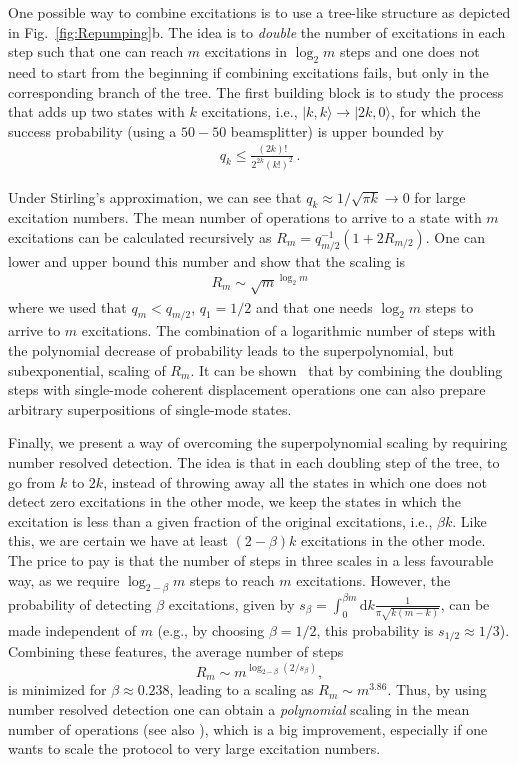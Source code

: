 \documentclass[twocolumn,pra,aps,superscriptaddress,showpacs]{revtex4-1}
\newcommand{\ket}[1]{|#1\rangle}
\newcommand{\rd}{\mathrm{d}}
\begin{document}
One possible way to combine excitations is to use a tree-like structure as depicted in Fig.~\ref{fig:Repumping}b. The idea is to \emph{double} the number of excitations in each step such that one can reach $m$ excitations in $\log_2 m$ steps and one does not need to start from the beginning if combining excitations fails, but only in the corresponding branch of the tree. The first building block is to study the process that adds up two states with $k$ excitations, i.e., $\ket{k,k} \rightarrow \ket{2k,0}$, for which the success probability (using a $50-50$ beamsplitter) is upper bounded by
%
\begin{align}
q_k 
	\leq \frac{(2k)!}{2^{2k}(k!)^2}\,.
\end{align}

Under Stirling's approximation, we can see that $q_k \approx 1/\sqrt{\pi k} \rightarrow 0$ for large excitation numbers.  The mean number of operations to arrive to a state with $m$ excitations can be calculated recursively as $R_m = q^{-1}_{m/2} \left( 1 + 2 R_{m/2} \right)$. One can lower and upper bound this number and show that the scaling is
%
\begin{align}
\label{eq:R_m}
	R_m \sim \sqrt{m}^{\log_2 m}
\end{align}
where we used that $q_{m}<q_{m/2}$, $q_1=1/2$ and that one needs $\log_2 m$ steps to arrive to $m$ excitations. The combination of a logarithmic number of steps with the polynomial decrease of probability leads to the superpolynomial, but subexponential, scaling of $R_m$. It can be shown~\cite{fiurasek05a} that by combining the doubling steps with single-mode coherent displacement operations one can also prepare arbitrary superpositions of single-mode states.

Finally, we present a way of overcoming the superpolynomial scaling by requiring number resolved detection. The idea is that in each doubling step of the tree, to go from $k$ to $2k$, instead of throwing away all the states in which one does not detect zero excitations in the other mode, we keep the states in which the excitation is less than a given fraction of the original excitations, i.e., $\beta k$. Like this, we are certain we have at least $(2-\beta)k$ excitations in the other mode. The price to pay is that the number of steps in three scales in a less favourable way, as we require $\log_{2-\beta}m$ steps to reach $m$ excitations. However, the probability of detecting $\beta$ excitations, given by $s_\beta = \int_{0}^{\beta m} \rd k \frac{1}{\pi \sqrt{k(m-k)}}$, can be made independent of $m$ (e.g., by choosing $\beta=1/2$, this probability is $s_{1/2} \approx 1/3$). Combining these features, the average number of steps 
\begin{equation}
	R_m
	\sim m^{\log_{2-\beta} (2 /  s_\beta)},
\end{equation}
%
is minimized for $\beta \approx 0.238$, leading to a scaling as $R_m \sim m^{3.86}$. Thus, by using number resolved detection one can obtain a \emph{polynomial} scaling in the mean number of operations (see also \cite{motes16}), which is a big improvement, especially if one wants to scale the protocol to very large excitation numbers.
\end{document}
